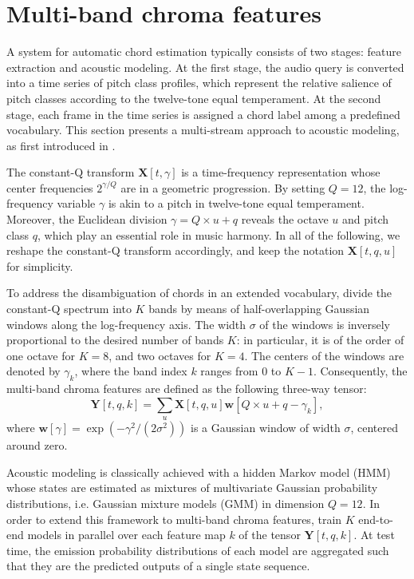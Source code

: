 \documentclass{article}
\makeatletter
\newcommand*{\ie}{i.e.\@\xspace}
\makeatother
\begin{document}
\section{Multi-band chroma features}
A system for automatic chord estimation typically consists of two stages:
feature extraction and acoustic modeling.
At the first stage, the audio query is converted into a time series of
pitch class profiles, which represent the relative salience of
pitch classes according to the twelve-tone equal temperament.
At the second stage, each frame in the time series is assigned
a chord label among a predefined vocabulary.
This section presents a multi-stream approach to acoustic modeling,
as first introduced in \cite{cho2013mirex}.

The constant-Q transform $\mathbf{X}[t, \gamma]$ is a time-frequency
representation whose center frequencies $2^{\gamma/Q}$ are in a geometric progression.
By setting $Q=12$, the log-frequency variable $\gamma$ is akin to a pitch in twelve-tone
equal temperament.
Moreover, the Euclidean division $\gamma = Q \times u + q$
reveals the octave $u$ and pitch class $q$,
which play an essential role in music harmony.
In all of the following, we reshape the constant-Q transform
accordingly, and keep the notation $\mathbf{X}[t, q, u]$ for simplicity.

To address the disambiguation of chords in an extended vocabulary,
\cite{cho2013mirex} divide the constant-Q spectrum into $K$
bands by means of half-overlapping Gaussian windows along
the log-frequency axis.
The width $\sigma$ of the windows is inversely proportional
to the desired number of bands $K$:
in particular, it is of the order of one octave for $K=8$,
and two octaves for $K=4$.
The centers of the windows are denoted by $\gamma_k$, where
the band index $k$ ranges from $0$ to $K-1$.
Consequently, the multi-band chroma features are defined as the following
three-way tensor:
\begin{equation}
\mathbf{Y}[t, q, k]
=
\sum_{u} 
\mathbf{X}[t, q, u]
\boldsymbol{w}[Q \times u + q - \gamma_k],
\end{equation}
where
$\boldsymbol{w}[\gamma] = \exp( - \gamma^2 / (2\sigma^2))$
is a Gaussian window of width $\sigma$, centered around zero.

Acoustic modeling is classically achieved with a hidden Markov model (HMM)
whose states are estimated as mixtures of multivariate Gaussian probability
distributions, \ie Gaussian mixture models (GMM) in dimension $Q=12$.
In order to extend this framework to multi-band chroma features, \cite{cho2013mirex}
train $K$ end-to-end models in parallel over each feature map $k$
of the tensor $\mathbf{Y}[t, q, k]$.
At test time, the emission probability distributions of each model
are aggregated such that they are the predicted outputs of a single state sequence.
\end{document}
